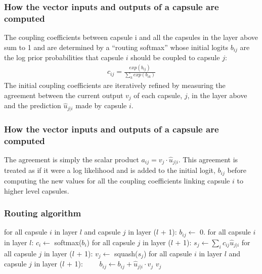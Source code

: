 \documentclass{beamer}
\begin{document}
\begin{frame}
\frametitle{How the vector inputs and outputs of a capsule are computed}
The coupling coefficients between capsule i and all the capsules in the layer above sum to 1 and are determined by a ``routing softmax'' whose initial logits \(b_{ij}\) are the log prior probabilities that capsule \(i\) should be coupled to capsule \(j\):
\begin{equation}
\begin{split}
c_{ij} = \frac{exp(b_{ij})}{\sum_{k}exp(b_{ik})}
\end{split}
\end{equation}
The initial coupling coefficients are iteratively refined by measuring the agreement between the current output \(v_j\) of each capsule, \(j\), in the layer above and the prediction \(\hat{u}_{j|i}\) made by capsule \(i\).
\end{frame}

\begin{frame}
\frametitle{How the vector inputs and outputs of a capsule are computed}
The agreement is simply the scalar product \(a_{ij} = v_j \cdot \hat{u}_{j|i}\). This agreement is treated as if it were a log likelihood and is added to the initial logit, \(b_{ij}\) before computing the new values for all the coupling coefficients linking capsule \(i\) to higher level capsules.
\end{frame}

\begin{frame}
\frametitle{Routing algorithm}
\begin{algorithmic}[1]
	\State for all capsule $i$ in layer $l$ and capsule $j$ in layer ($l$ + 1): $b_{ij} \gets$ 0.
			\State for all capsule $i$ in layer $l$: $c_i \gets$ softmax($b_i$)
			\State for all capsule $j$ in layer ($l$ + 1): $s_j \gets \sum_{i}c_{ij}\hat{u}_{j|i}$
			\State for all capsule $j$ in layer ($l$ + 1): $v_j \gets$ squash($s_j$)
			\State for all capsule $i$ in layer $l$ and capsule $j$ in layer ($l$ + 1): 
			\State \ \ \ \ $b_{ij} \gets b_{ij} + \hat{u}_{j|i} \cdot v_j$
		\EndFor
		\Return $v_j$
\EndFunction
\end{algorithmic}
\end{frame}
\end{document}
